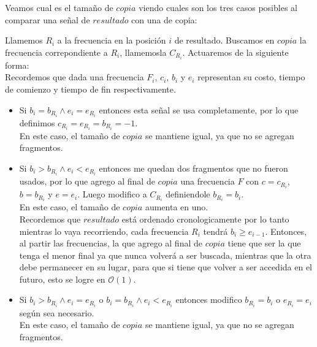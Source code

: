 \begin{enumerate}
   Veamos cual es el tamaño de $copia$ viendo cuales son los tres casos posibles al comparar una señal de $resultado$ con una de copia:

           Llamemos $R_{i}$ a la frecuencia en la posición $i$ de resultado. Buscamos en $copia$ la frecuencia correpondiente a $R_{i}$, llamemosla $C_{R_{i}}$. Actuaremos de la siguiente forma: \\

        Recordemos que dada una frecuencia $F_{i}$, $c_{i}$, $b_{i}$ y $e_{i}$ representan su costo, tiempo de comienzo y tiempo de fin respectivamente.
        \begin{itemize}

          \item Si $b_{i} = b_{R_{i}} \land e_{i} = e_{R_{i}}$ entonces esta señal se usa completamente, por lo que definimos $c_{R_{i}} = e_{R_{i}} = b_{R_{i}} = -1$. \\

En este caso, el tamaño de $copia$ se mantiene igual, ya que no se agregan fragmentos. \\

          \item  Si $b_{i} > b_{R_{i}} \land e_{i} < e_{R_{i}}$ entonces me quedan dos fragmentos que no fueron usados, por lo que agrego al final de $copia$ una frecuencia $F$ con $c = c_{R_{i}}$, $b = b_{R_{i}}$ y $e = e_{i}$. Luego modifico a $C_{R_{i}}$ definiendole $b_{R_{i}} = b_{i}$. \\

En este caso, el tamaño de $copia$ aumenta en uno. \\
Recordemos que $resultado$ está ordenado cronologicamente por lo tanto mientras lo vaya recorriendo, cada frecuencia $R_{i}$ tendrá $b_{i} \geq e_{i-1}$. Entonces, al partir las frecuencias, la que agrego al final de $copia$ tiene que ser la que tenga el menor final ya que nunca volverá a ser buscada, mientras que la otra debe permanecer en su lugar, para que si tiene que volver a ser accedida en el futuro, esto se logre en $\mathcal{O}(1)$.\\ 


          \item Si $b_{i} > b_{R_{i}} \land e_{i} = e_{R_{i}}$ o $b_{i} = b_{R_{i}} \land e_{i} < e_{R_{i}}$ entonces modifico $b_{R_{i}} = b_{i}$ o $e_{R_{i}} = e_{i}$ según sea necesario. \\

          En este caso, el tamaño de $copia$ se mantiene igual, ya que no se agregan fragmentos. \\



\end{itemize}
\end{enumerate}
